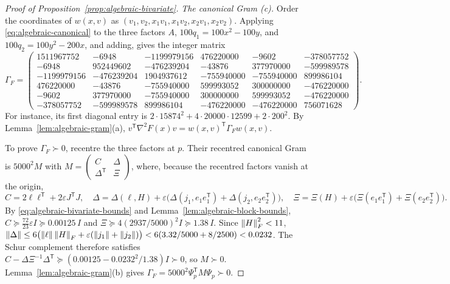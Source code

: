 \begin{proof}[Proof of Proposition~\ref{prop:algebraic-bivariate}]
\emph{The canonical Gram (c).} Order the coordinates of $w(x,v)$ as
$(v_1,v_2,x_1v_1,x_1v_2,x_2v_1,x_2v_2)$. Applying \eqref{eq:algebraic-canonical}
to the three factors $A$, $100q_1=100x^2-100y$, and $100q_2=100y^2-200x$, and
adding, gives the integer matrix
\begin{equation}
 \Gamma_F=\begin{pmatrix}
 1511967752&-6948&-1199979156&476220000&-9602&-378057752\\
 -6948&952449602&-476239204&-43876&377970000&-599989578\\
 -1199979156&-476239204&1904937612&-755940000&-755940000&899986104\\
 476220000&-43876&-755940000&599993052&300000000&-476220000\\
 -9602&377970000&-755940000&300000000&599993052&-476220000\\
 -378057752&-599989578&899986104&-476220000&-476220000&756071628
 \end{pmatrix}.
 \label{eq:algebraic-bivariate-gram}
\end{equation}
For instance, its first diagonal entry is $2\cdot15874^2+4\cdot20000\cdot12599
+2\cdot200^2$. By Lemma~\ref{lem:algebraic-gram}(a),
$v^{\mathsf T}\nabla^2F(x)v=w(x,v)^{\mathsf T}\Gamma_Fw(x,v)$.

To prove $\Gamma_F\succ0$, recentre the three factors at $p$. Their recentred
canonical Gram is $5000^2M$ with
$M=\left(\begin{smallmatrix}C&\Delta\\\Delta^{\mathsf T}&\Xi\end{smallmatrix}
\right)$, where, because the recentred factors vanish at the origin,
\[
 C=2\ell\ell^{\mathsf T}+2\varepsilon J^{\mathsf T}J,\quad
 \Delta=\Delta(\ell,H)+\varepsilon\bigl(\Delta(j_1,e_1e_1^{\mathsf T})
          +\Delta(j_2,e_2e_2^{\mathsf T})\bigr),\quad
 \Xi=\Xi(H)+\varepsilon\bigl(\Xi(e_1e_1^{\mathsf T})+\Xi(e_2e_2^{\mathsf T})\bigr).
\]
By \eqref{eq:algebraic-bivariate-bounds} and
Lemma~\ref{lem:algebraic-block-bounds}, $C\succeq\tfrac{72}{23}\varepsilon I
\succeq0.00125\,I$ and $\Xi\succeq4(2937/5000)^2I\succeq1.38\,I$. Since
$\left\lVert H\right\rVert_F^2<11$,
$\left\lVert\Delta\right\rVert\le6\bigl(\left\lVert\ell\right\rVert\left\lVert H\right\rVert_F+\varepsilon(\left\lVert j_1\right\rVert+\left\lVert j_2\right\rVert)\bigr)
<6(3.32/5000+8/2500)<0.0232$. The Schur complement therefore satisfies
$C-\Delta\Xi^{-1}\Delta^{\mathsf T}\succeq(0.00125-0.0232^2/1.38)I\succ0$, so
$M\succ0$. Lemma~\ref{lem:algebraic-gram}(b) gives
$\Gamma_F=5000^2\Psi_p^{\mathsf T}M\Psi_p\succ0$.


\end{proof}
